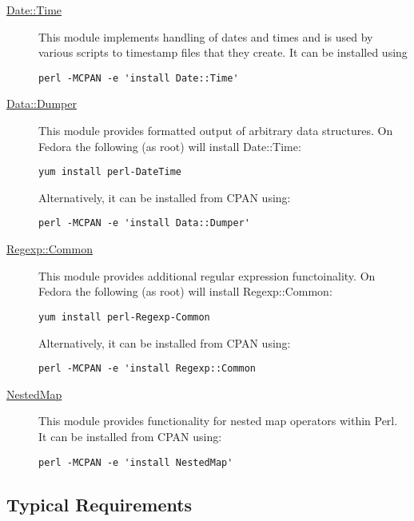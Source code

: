 \begin{description}
\item [\href{http://search.cpan.org/~drolsky/DateTime-0.70/lib/DateTime.pm}{{\normalfont \ttfamily Date::Time }}] This module implements handling of dates and times and is used by various scripts to timestamp files that they create. It can be installed using
\begin{verbatim}
perl -MCPAN -e 'install Date::Time'
\end{verbatim}

\item [\href{http://search.cpan.org/~smueller/Data-Dumper-2.131/Dumper.pm}{{\normalfont \ttfamily Data::Dumper }}] This module provides formatted output of arbitrary data structures. On Fedora the following (as root) will install {\normalfont \ttfamily Date::Time}:
\begin{verbatim}
yum install perl-DateTime
\end{verbatim}
Alternatively, it can be installed from CPAN using:
\begin{verbatim}
perl -MCPAN -e 'install Data::Dumper'
\end{verbatim}

\item [\href{http://search.cpan.org/~abigail/Regexp-Common-2017060201/lib/Regexp/Common.pm}{{\normalfont \ttfamily Regexp::Common }}] This module provides additional regular expression functoinality. On Fedora the following (as root) will install {\normalfont \ttfamily Regexp::Common}:
\begin{verbatim}
yum install perl-Regexp-Common
\end{verbatim}
Alternatively, it can be installed from CPAN using:
\begin{verbatim}
perl -MCPAN -e 'install Regexp::Common
\end{verbatim}

\item [\href{http://search.cpan.org/~dcantrell/NestedMap-1.0/lib/NestedMap.pm}{{\normalfont \ttfamily NestedMap}}] This module provides functionality for nested map operators within Perl. It can be installed from CPAN using:
\begin{verbatim}
perl -MCPAN -e 'install NestedMap'
\end{verbatim}
\end{description}

\subsection{Typical Requirements}\label{sec:requirementsTypical}

